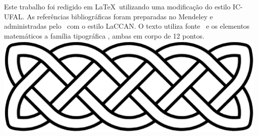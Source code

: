 \documentclass[tcc]{ic}
\begin{document}
% 

\begin{raggedright}

\renewcommand{\bibsection}{
\chapter*{\vspace{-3cm}\centering \Large \textsc{Referências Bibliográficas}}
\addcontentsline{toc}{chapter}{Referências Bibliográficas}
}

\newpage\lhead{\rightmark}
\end{raggedright}


\chapter*{}
\vfill
\singlespacing
\thispagestyle{empty}
\begin{center}
Este trabalho foi redigido em {\large \LaTeX}\ utilizando uma modificação do estilo \textsf{IC-UFAL}.
As referências bibliográficas foram preparadas no \textsf{Mendeley} e administradas pelo {\large\BibTeX}\ com o estilo \textsf{LaCCAN}.
O texto utiliza fonte \NomeFonte\ e os elementos matemáticos a família tipográfica \NomeFonteMat, ambas em corpo de 12 pontos.
\vspace{.5cm}
\includegraphics[width=.5\textwidth]{./capitulos/figs/celtic_knot_cross_stitch}
\end{center}
\end{document}
